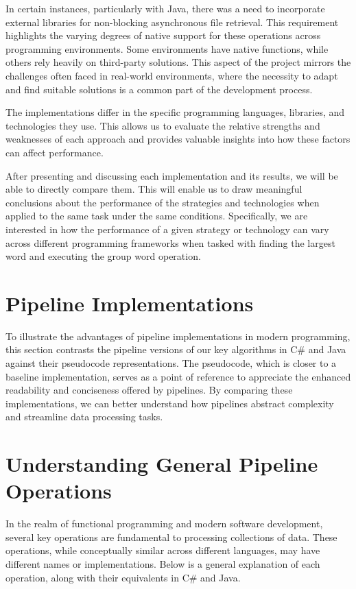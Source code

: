 In certain instances, particularly with Java, there was a need to incorporate external libraries for non-blocking asynchronous file retrieval. This requirement highlights the varying degrees of native support for these operations across programming environments. Some environments have native functions, while others rely heavily on third-party solutions. This aspect of the project mirrors the challenges often faced in real-world environments, where the necessity to adapt and find suitable solutions is a common part of the development process.

The implementations differ in the specific programming languages, libraries, and technologies they use. This allows us to evaluate the relative strengths and weaknesses of each approach and provides valuable insights into how these factors can affect performance.

After presenting and discussing each implementation and its results, we will be able to directly compare them. This will enable us to draw meaningful conclusions about the performance of the strategies and technologies when applied to the same task under the same conditions. Specifically, we are interested in how the performance of a given strategy or technology can vary across different programming frameworks when tasked with finding the largest word and executing the group word operation.


\section{Pipeline Implementations}
\label{sec:pipeline_implementations}

To illustrate the advantages of pipeline implementations in modern programming, this section contrasts the pipeline versions of our key algorithms in C\# and Java against their pseudocode representations. The pseudocode, which is closer to a baseline implementation, serves as a point of reference to appreciate the enhanced readability and conciseness offered by pipelines. By comparing these implementations, we can better understand how pipelines abstract complexity and streamline data processing tasks.

\section{Understanding General Pipeline Operations}
\label{sec:understanding_pipeline_operations}

In the realm of functional programming and modern software development, several key operations are fundamental to processing collections of data. These operations, while conceptually similar across different languages, may have different names or implementations. Below is a general explanation of each operation, along with their equivalents in C\# and Java.

